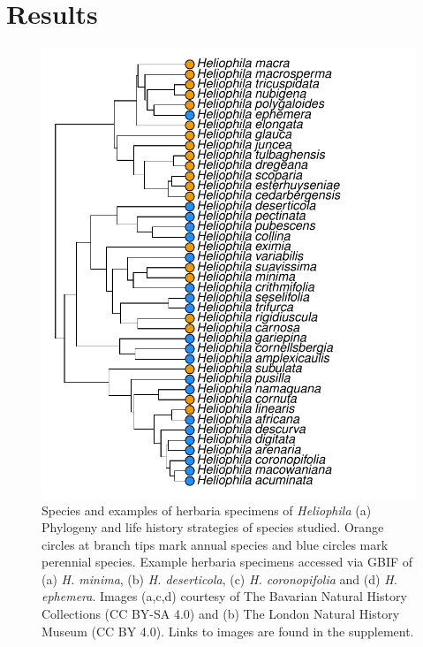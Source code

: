 \documentclass[man,floatsintext]{apa6}
\theoremstyle{definition}
\theoremstyle{definition}
\theoremstyle{definition}
\theoremstyle{remark}
\begin{document}
\hypertarget{results}{%
\section{Results}\label{results}}











\begin{figure}[!h]
\includegraphics[width=\textwidth]{../figures/phylogeny} \caption{Species and examples of herbaria specimens of
\emph{Heliophila} (a) Phylogeny and life history strategies of species
studied. Orange circles at branch tips mark annual species and blue
circles mark perennial species. Example herbaria specimens accessed via
GBIF of (a) \emph{H. minima}, (b) \emph{H. deserticola}, (c) \emph{H.
coronopifolia} and (d) \emph{H. ephemera}. Images (a,c,d) courtesy of
The Bavarian Natural History Collections (CC BY-SA 4.0) and (b) The
London Natural History Museum (CC BY 4.0). Links to images are found in
the supplement.}\label{fig:phylogeny}
\end{figure}
\end{document}
